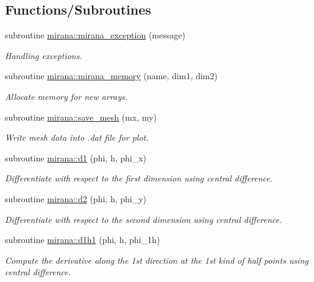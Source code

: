 \subsection*{Functions/\+Subroutines}
\begin{DoxyCompactItemize}
\item 
subroutine \hyperlink{namespacemirana_ab002a22665f70b4c65bdcf70ac96d768}{mirana\+::mirana\+\_\+exception} (message)
\begin{DoxyCompactList}\small\item\em Handling exceptions. \end{DoxyCompactList}\item 
subroutine \hyperlink{namespacemirana_acccf612b21e3e65bd3a78131c48afe2b}{mirana\+::mirana\+\_\+memory} (name, dim1, dim2)
\begin{DoxyCompactList}\small\item\em Allocate memory for new arrays. \end{DoxyCompactList}\item 
subroutine \hyperlink{namespacemirana_a9cbee1a318e5e828590c9ccaa51c8472}{mirana\+::save\+\_\+mesh} (mx, my)
\begin{DoxyCompactList}\small\item\em Write mesh data into .dat file for plot. \end{DoxyCompactList}\item 
subroutine \hyperlink{namespacemirana_a4009036e8b04ac992641e36d34ab0ed4}{mirana\+::d1} (phi, h, phi\+\_\+x)
\begin{DoxyCompactList}\small\item\em Differentiate with respect to the first dimension using central difference. \end{DoxyCompactList}\item 
subroutine \hyperlink{namespacemirana_a21348ffe170eafc6fc2a009256b1b6e3}{mirana\+::d2} (phi, h, phi\+\_\+y)
\begin{DoxyCompactList}\small\item\em Differentiate with respect to the second dimension using central difference. \end{DoxyCompactList}\item 
subroutine \hyperlink{namespacemirana_acc84c99770972f6328e89ac04ac67153}{mirana\+::d1h1} (phi, h, phi\+\_\+1h)
\begin{DoxyCompactList}\small\item\em Compute the derivative along the 1st direction at the 1st kind of half points using central difference. \end{DoxyCompactList}\item 

\end{DoxyCompactItemize}
